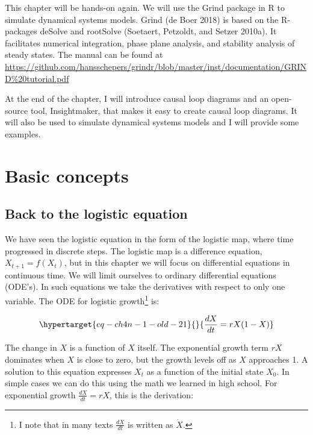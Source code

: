\documentclass[
  a4paper,
  DIV=11,
  numbers=noendperiod]{scrreprt}
\begin{document}
This chapter will be hands-on again. We will use the Grind package in R
to simulate dynamical systems models. Grind (de Boer 2018) is based on
the R-packages deSolve and rootSolve (Soetaert, Petzoldt, and Setzer
2010a). It facilitates numerical integration, phase plane analysis, and
stability analysis of steady states. The manual can be found at
\url{https://github.com/hansschepers/grindr/blob/master/inst/documentation/GRIND\%20tutorial.pdf}

At the end of the chapter, I will introduce causal loop diagrams and an
open-source tool, Insightmaker, that makes it easy to create causal loop
diagrams. It will also be used to simulate dynamical systems models and
I will provide some examples.

\hypertarget{sec-Basic-concepts}{%
\section{Basic concepts}\label{sec-Basic-concepts}}

\hypertarget{sec-Back-to-the-logistic-equation}{%
\subsection{Back to the logistic
equation}\label{sec-Back-to-the-logistic-equation}}

We have seen the logistic equation in the form of the logistic map,
where time progressed in discrete steps. The logistic map is a
difference equation, \(X_{t + 1} = f(X_{t})\), but in this chapter we
will focus on differential equations in continuous time. We will limit
ourselves to ordinary differential equations (ODE's). In such equations
we take the derivatives with respect to only one variable. The ODE for
logistic growth\footnote{I note that in many texts \(\frac{dX}{dt}\) is
  written as \(\dot{X}\).} is:

\begin{equation}\protect\hypertarget{eq-ch4n-1-old-21}{}{
\frac{dX}{dt} = rX(1 - X)
}\label{eq-ch4n-1-old-21}\end{equation}

The change in \(X\) is a function of \(X\) itself. The exponential
growth term \(rX\) dominates when \(X\) is close to zero, but the growth
levels off as \(X\) approaches 1. A solution to this equation expresses
\(X_{t}\) as a function of the initial state \(X_{0}\). In simple cases
we can do this using the math we learned in high school. For exponential
growth \(\frac{dX}{dt} = rX\), this is the derivation:
\end{document}
